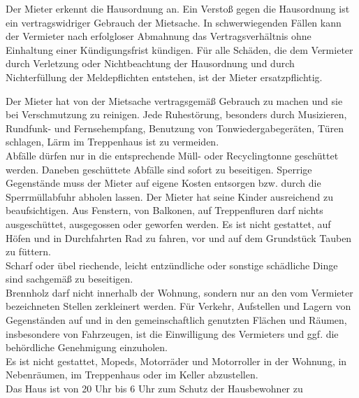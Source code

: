 \documentclass{scrreprt}[12pt,a4paper,twoside,duplex]
\begin{document}
\begin{contract}

\begin{multicols}{2}
  Der Mieter erkennt die Hausordnung an. Ein Verstoß gegen die
  Hausordnung ist ein vertragswidriger Gebrauch der Mietsache. In
  schwerwiegenden Fällen kann der Vermieter nach erfolgloser Abmahnung das
  Vertragsverhältnis ohne Einhaltung einer Kündigungsfrist kündigen. Für alle
  Schäden, die dem Vermieter durch Verletzung oder Nichtbeachtung der
  Hausordnung und durch Nichterfüllung der Meldepflichten entstehen, ist der
  Mieter ersatzpflichtig.

  \begin{description}[style=unboxed,leftmargin=0cm]
    \item[Allgemeine Ordnungsbestimmungen] Der Mieter hat von der Mietsache
    vertragsgemäß Gebrauch zu machen und sie bei Verschmutzung zu reinigen. Jede
    Ruhestörung, besonders durch Musizieren, Rundfunk- und Fernsehempfang,
    Benutzung von Tonwiedergabegeräten, Türen schlagen, Lärm im Treppenhaus ist
    zu vermeiden.\\
    Abfälle dürfen nur in die entsprechende Müll- oder Recyclingtonne geschüttet
    werden. Daneben geschüttete Abfälle sind sofort zu beseitigen. Sperrige
    Gegenstände muss der Mieter auf eigene Kosten entsorgen bzw. durch die
    Sperrmüllabfuhr abholen lassen. Der Mieter hat seine Kinder ausreichend zu
    beaufsichtigen. Aus Fenstern, von Balkonen, auf Treppenfluren darf nichts
    ausgeschüttet, ausgegossen oder geworfen werden. Es ist nicht gestattet, auf
    Höfen und in Durchfahrten Rad zu fahren, vor und auf dem Grundstück Tauben
    zu füttern.\\
    Scharf oder übel riechende, leicht entzündliche oder sonstige schädliche
    Dinge sind sachgemäß zu beseitigen.\\
    Brennholz darf nicht innerhalb der Wohnung, sondern nur an den vom Vermieter
    bezeichneten Stellen zerkleinert werden. Für Verkehr, Aufstellen und Lagern
    von Gegenständen auf und in den gemeinschaftlich genutzten Flächen und
    Räumen, insbesondere von Fahrzeugen, ist die Einwilligung des Vermieters
    und ggf. die behördliche Genehmigung einzuholen.\\
    Es ist nicht gestattet, Mopeds, Motorräder und Motorroller in der Wohnung,
    in Nebenräumen, im Treppenhaus oder im Keller abzustellen.\\
    Das Haus ist von 20 Uhr bis 6 Uhr zum Schutz der Hausbewohner zu

\end{description}
\end{multicols}
\end{contract}
\end{document}
